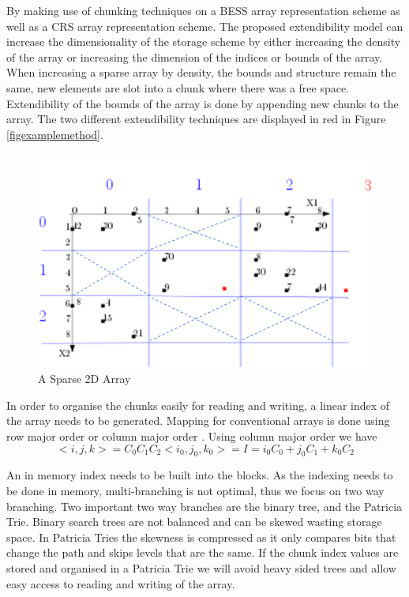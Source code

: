  By making use of chunking techniques on a BESS array representation scheme as well as a CRS array representation scheme. The proposed extendibility model can increase the dimensionality of the storage scheme by either increasing the density of the array or increasing the dimension of the indices or bounds of the array. When increasing a sparse array by density, the bounds and structure remain the same, new elements are slot into a chunk where there was a free space. Extendibility of the bounds of the array is done by appending new chunks to the array. The two different extendibility techniques are displayed in red in Figure \ref{figexamplemethod}.
 
  \begin{figure}[H]
 	\centering
 	\includegraphics[width=0.7\linewidth]{methodExampleCrossed}
 	\caption{A Sparse 2D Array}
 	\label{fig:examplemethod}
 \end{figure}
 
 In order to organise the chunks easily for reading and writing, a linear index of the array needs to be generated. Mapping for conventional arrays is done using row major order or column major order \cite{otoo:2013:ced}. Using column major order we have 
 \begin{equation}
 <i,j,k> = C_0 C_1 C_2 
 <i_0,j_0,k_0> = I = i_0C_0 + j_0C_1 + k_0C_2
 \end{equation} 
 
 An in memory index needs to be built into the blocks. As the indexing needs to be done in memory, multi-branching is not optimal, thus we focus on two way branching. Two important two way branches are the binary tree, and the Patricia Trie. Binary search trees are not balanced and can be skewed wasting storage space. In Patricia Tries the skewness is compressed as it only compares bits that change the path and skips levels that are the same. If the chunk index values are stored and organised in a Patricia Trie we will avoid heavy sided trees and allow easy access to reading and writing of the array.
 
